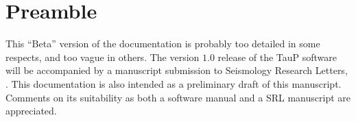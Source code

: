 
\section*{Preamble}

This ``Beta'' version of the documentation is probably too detailed in
some respects, and too vague in others. The version $1.0$ release of the
TauP software will be accompanied by a manuscript submission to
Seismology Research Letters, \cite{taupsrl}. This documentation is
also intended as a preliminary draft of this manuscript. Comments on
its suitability as both a software manual and a SRL
manuscript are appreciated.
